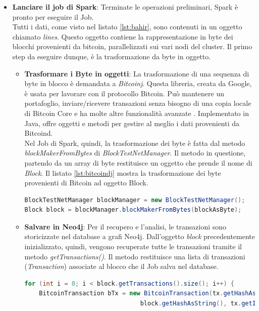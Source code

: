 \begin{itemize}
\item \textbf{Lanciare il job di Spark}: Terminate le operazioni preliminari, Spark è pronto per eseguire il Job. 
\\Tutti i dati, come visto nel listato \ref{lst:bahir}, sono contenuti in un oggetto chiamato \textit{lines}. Questo oggetto contiene la rappresentazione in byte dei blocchi provenienti da bitcoin, parallelizzati sui vari nodi del cluster. Il primo step da eseguire dunque, è la trasformazione da byte in oggetto.
\begin{itemize}
\item \textbf{Trasformare i Byte in oggetti}: La trasformazione di una sequenza di byte in blocco è demandata a \textit{Bitcoinj}. Questa libreria, creata da Google, è usata per lavorare con il protocollo Bitcoin. Può mantenere un portafoglio, inviare/ricevere transazioni senza bisogno di una copia locale di Bitcoin Core e ha molte altre funzionalità avanzate \cite{bitcoinj:home}. Implementato in Java, offre oggetti e metodi per gestire al meglio i dati provenienti da Bitcoind. 
\\ Nel Job di Spark, quindi, la trasformazione dei byte è fatta dal metodo \textit{blockMakerFromBytes} di \textit{BlockTestNetManager}. Il metodo in questione, partendo da un array di byte restituisce un oggetto che prende il nome di \textit{Block}. Il listato \ref{lst:bitcoindj} mostra la trasformazione dei byte provenienti di Bitcoin ad oggetto Block. 
\begin{lstlisting}[language=Java, label=lst:bitcoindj, caption={Array di Byte trasformato in oggetto Block.}]
BlockTestNetManager blockManager = new BlockTestNetManager();
Block block = blockManager.blockMakerFromBytes(blockAsByte);
\end{lstlisting}
\item \textbf{Salvare in Neo4j}: Per il recupero e l'analisi, le transazioni sono storicizzate nel database a grafi Neo4j. Dall'oggetto \textit{block} precedentemente inizializzato, quindi, vengono recuperate tutte le transazioni tramite il metodo \textit{getTransactions()}. Il metodo restituisce una lista di transazioni (\textit{Transaction}) associate al blocco che il Job salva nel database.
\begin{lstlisting}[language=Java, label=lst:saveNeo, caption={Prelievo transazioni e salvataggio in Neo4j.}]
for (int i = 0; i < block.getTransactions().size(); i++) {
	BitcoinTransaction bTx = new BitcoinTransaction(tx.getHashAsString(),
                                block.getHashAsString(), tx.getInputs(), tx.getOutputs(),

\end{lstlisting}
\end{itemize}
\end{itemize}
